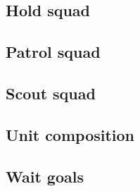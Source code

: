 \subsection{Hold squad}

\subsection{Patrol squad}

\subsection{Scout squad}

\subsection{Unit composition}

\subsection{Wait goals}
\label{sec:wait_goals}